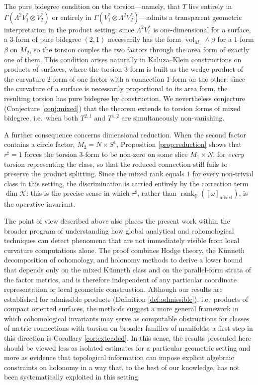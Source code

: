 \documentclass[11pt,reqno]{amsart}
\theoremstyle{plain}
\theoremstyle{definition}
\numberwithin{equation}{section}
\begin{document}
The pure bidegree condition on the torsion---namely, that $T$ lies entirely in $\Gamma(\Lambda^2 V_1^*\otimes V_2^*)$ or entirely in 
$\Gamma(V_1^*\otimes\Lambda^2 V_2^*)$---admits a transparent 
geometric interpretation in the product setting: since 
$\Lambda^2 V_i^*$ is one-dimensional for a surface, a $3$-form of pure bidegree $(2,1)$ necessarily has the form 
$\operatorname{vol}_{M_1}\wedge\beta$ for a $1$-form $\beta$ on $M_2$, so the torsion couples the two factors through the area form of exactly one of them.  This condition arises naturally in Kaluza--Klein constructions on products of surfaces, where the torsion $3$-form is built as the wedge product of the curvature $2$-form of one factor with a connection $1$-form on the other: since the curvature of a surface is necessarily proportional to its area form, the resulting torsion has pure bidegree by construction.  We nevertheless conjecture (Conjecture \ref{conj:mixed}) that the theorem extends to torsion forms of mixed bidegree, i.e.\ when both $T^{2,1}$ and $T^{1,2}$ are simultaneously non-vanishing.

A further consequence concerns dimensional reduction.  When the second factor contains a circle factor, $M_2=N\times S^1$, Proposition \ref{prop:reduction} shows that $r^{\sharp}=1$ forces the torsion $3$-form to be non-zero on some
slice $M_1\times N$, for \emph{every} torsion representing the class, so that the reduced connection still fails to preserve the product splitting.  Since the mixed rank equals $1$ for every non-trivial class in this setting, the discrimination is carried entirely by the correction term $\dim\mathcal{K}$:
this is the precise sense in which $r^{\sharp}$, rather than
$\operatorname{rank}_{\mathbb{R}}([\omega]_{\mathrm{mixed}})$, is the operative invariant.

The point of view described above also places the present work within the broader program of understanding how global analytical and cohomological techniques can detect phenomena that are not immediately visible from local curvature computations alone.  The proof combines Hodge theory, the
K\"unneth decomposition of cohomology, and holonomy methods to derive a lower bound that depends only on the mixed K\"unneth class and on the parallel-form strata of the factor metrics, and is therefore independent of any particular coordinate representation or local geometric construction.
Although our results are established for admissible products
(Definition \ref{def:admissible}), i.e.\ products of compact oriented surfaces, the methods suggest a more general framework in which cohomological invariants may serve as computable obstructions for classes of metric connections with torsion on broader families of manifolds; a first step in this direction is Corollary \ref{cor:extended}.  In this
sense, the results presented here should be viewed less as isolated estimates for a particular geometric setting and more as evidence that topological information can impose explicit algebraic constraints on holonomy in a way that, to the best of our knowledge, has not been systematically exploited in this setting.
\end{document}
